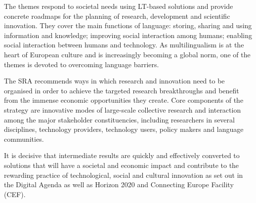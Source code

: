 \documentclass[10pt, plain]{../../metanetpaper}
\begin{document}
\begin{multicols}{2}
The themes respond to societal needs using LT-based solutions and provide concrete roadmaps for the planning of research, development and scientiﬁc innovation. They cover the main functions of language: storing, sharing and using information and knowledge; improving social interaction among humans; enabling social interaction between humans and technology. As multilingualism is at the heart of European culture and is increasingly becoming a global  norm, one of the themes is devoted to overcoming language barriers. 

The SRA recommends ways in which research and innovation need to be organised in order to achieve the targeted research breakthroughs and beneﬁt from the immense economic opportunities they create. Core components of the strategy are innovative modes of large-scale collective research and interaction among the major stakeholder constituencies, including researchers in several disciplines, technology providers, technology users, policy makers and language communities. 

It is decisive that intermediate results are quickly and effectively converted to solutions that will have a societal and economic impact and contribute to the rewarding practice of technological, social and cultural innovation as set out in the Digital Agenda as well as Horizon 2020 and Connecting Europe Facility (CEF). 
\end{multicols}

\cleardoublepage



\end{document}
